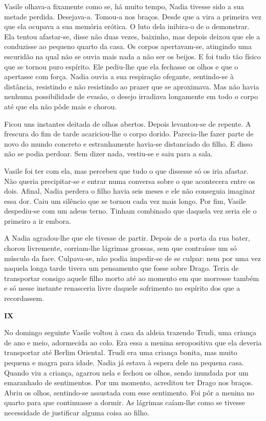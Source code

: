 Vasile olhava-a fixamente como se, há muito tempo, Nadia tivesse sido a
sua metade perdida. Desejava-a. Tomou-a nos braços. Desde que a vira a
primeira vez que ela ocupava a sua memória erótica. O luto dela
inibira-o de o demonstrar. Ela tentou afastar-se, disse não duas vezes,
baixinho, mas depois deixou que ele a conduzisse ao pequeno quarto da
casa. Os corpos apertavam-se, atingindo uma escuridão na qual não se
ouvia mais nada a não ser os beijos. E foi tudo tão físico que se tornou
puro espírito. Ele pediu-lhe que ela fechasse os olhos e que o apertasse com força. Nadia ouvia a sua respiração ofegante, sentindo-se à
distância, resistindo e não resistindo ao prazer que se aproximava. Mas
não havia nenhuma possibilidade de evasão, o desejo irradiava longamente
em todo o corpo até que ela não pôde mais e chorou.

Ficou uns instantes deitada de olhos abertos. Depois levantou-se de
repente. A frescura do fim de tarde acariciou-lhe o corpo dorido.
Parecia-lhe fazer parte de novo do mundo concreto e estranhamente
havia-se distanciado do filho. E disso não se podia perdoar. Sem dizer
nada, vestiu-se e saiu para a sala.

Vasile foi ter com ela, mas percebeu que tudo o que dissesse só os iria
afastar. Não queria precipitar-se e entrar numa conversa sobre o que
acontecera entre os dois. Afinal, Nadia perdera o filho havia seis
meses e ele não conseguia imaginar essa dor. Caiu um silêncio que se
tornou cada vez mais longo. Por fim, Vasile despediu-se com um adeus
terno. Tinham combinado que daquela vez seria ele o primeiro a ir
embora.

A Nadia agradou-lhe que ele tivesse de partir. Depois de a porta da rua
bater, chorou livremente, corriam-lhe lágrimas grossas, sem que
contraísse um só músculo da face. Culpava-se, não podia impedir-se de se
culpar: nem por uma vez naquela longa tarde tivera um pensamento que
fosse sobre Drago. Teria de transportar consigo aquele filho morto até
ao momento em que morresse também e só nesse instante renasceria livre
daquele sofrimento no espírito dos que a recordassem.


\pagebreak
\vspace*{1.8cm}
\noindent{}\textbf{IX}

\bigskip

No domingo seguinte Vasile voltou à casa da aldeia trazendo Trudi, uma
criança de ano e meio, adormecida ao colo. Era essa a menina
seropositiva que ela deveria transportar até Berlim Oriental. Trudi
era uma criança bonita, mas muito pequena e magra para idade. Nadia já
estava à espera dele na pequena casa. Quando viu a criança, agarrou
nela e fechou os olhos, sendo inundada por um emaranhado de
sentimentos. Por um momento, acreditou ter Drago nos braços. Abriu os
olhos, sentindo-se assustada com esse sentimento. Foi pôr a menina no
quarto para que continuasse a dormir. As lágrimas caíam-lhe como se
tivesse necessidade de justificar alguma coisa ao filho.

